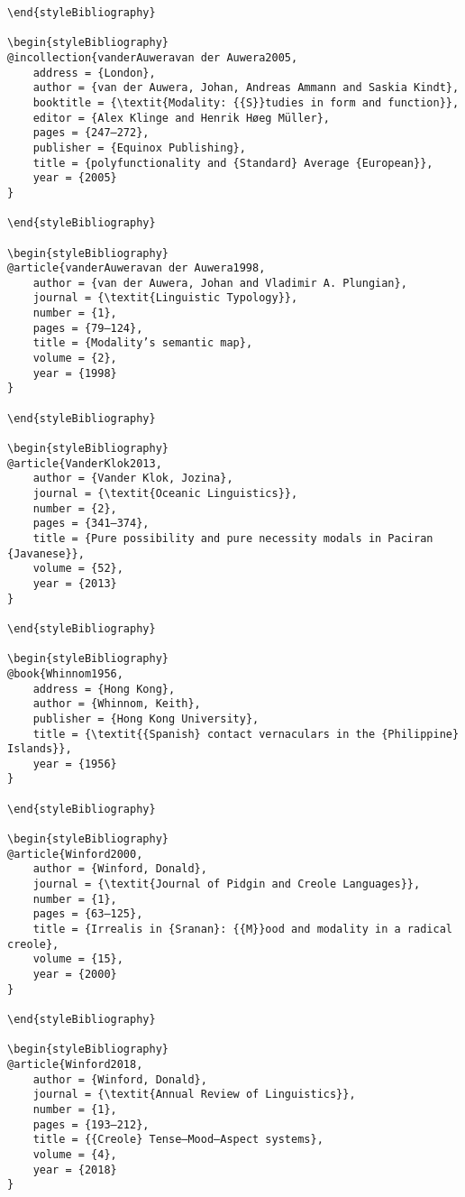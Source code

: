 \documentclass[output=paper]{langsci/langscibook}
\begin{document}
\begin{stylelsUnNumberedSection}
\begin{verbatim}
\end{styleBibliography}

\begin{styleBibliography}
@incollection{vanderAuweravan der Auwera2005,
	address = {London},
	author = {van der Auwera, Johan, Andreas Ammann and Saskia Kindt},
	booktitle = {\textit{Modality: {{S}}tudies in form and function}},
	editor = {Alex Klinge and Henrik Høeg Müller},
	pages = {247–272},
	publisher = {Equinox Publishing},
	title = {polyfunctionality and {Standard} Average {European}},
	year = {2005}
}

\end{styleBibliography}

\begin{styleBibliography}
@article{vanderAuweravan der Auwera1998,
	author = {van der Auwera, Johan and Vladimir A. Plungian},
	journal = {\textit{Linguistic Typology}},
	number = {1},
	pages = {79–124},
	title = {Modality’s semantic map},
	volume = {2},
	year = {1998}
}

\end{styleBibliography}

\begin{styleBibliography}
@article{VanderKlok2013,
	author = {Vander Klok, Jozina},
	journal = {\textit{Oceanic Linguistics}},
	number = {2},
	pages = {341–374},
	title = {Pure possibility and pure necessity modals in Paciran {Javanese}},
	volume = {52},
	year = {2013}
}

\end{styleBibliography}

\begin{styleBibliography}
@book{Whinnom1956,
	address = {Hong Kong},
	author = {Whinnom, Keith},
	publisher = {Hong Kong University},
	title = {\textit{{Spanish} contact vernaculars in the {Philippine} Islands}},
	year = {1956}
}

\end{styleBibliography}

\begin{styleBibliography}
@article{Winford2000,
	author = {Winford, Donald},
	journal = {\textit{Journal of Pidgin and Creole Languages}},
	number = {1},
	pages = {63–125},
	title = {Irrealis in {Sranan}: {{M}}ood and modality in a radical creole},
	volume = {15},
	year = {2000}
}

\end{styleBibliography}

\begin{styleBibliography}
@article{Winford2018,
	author = {Winford, Donald},
	journal = {\textit{Annual Review of Linguistics}},
	number = {1},
	pages = {193–212},
	title = {{Creole} Tense–Mood–Aspect systems},
	volume = {4},
	year = {2018}
}


\end{verbatim}
\end{stylelsUnNumberedSection}
\end{document}
